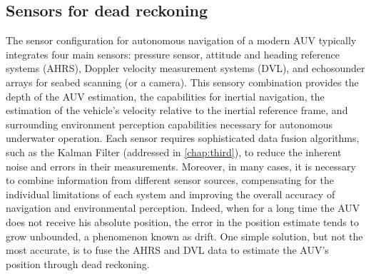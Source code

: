 \subsection{Sensors for dead reckoning} %
The sensor configuration for autonomous navigation of a modern AUV typically integrates four main sensors: pressure sensor, attitude and heading reference 
systems (AHRS), Doppler velocity measurement systems (DVL), and echosounder arrays for seabed scanning (or a camera). This sensory combination provides the depth of the AUV estimation, 
the capabilities for inertial navigation, the estimation of the vehicle's velocity relative to the inertial reference frame, and surrounding environment perception 
capabilities necessary for autonomous underwater operation. 
Each sensor requires sophisticated data fusion algorithms, such as the Kalman Filter (addressed in \ref{chap:third}), to reduce the inherent noise and
errors in their measurements. Moreover, in many cases, it is necessary to combine information from different sensor sources, compensating for the individual 
limitations of each system and improving the overall accuracy of navigation and environmental perception. Indeed, when for a long time the AUV does not receive 
his absolute position, the error in the position estimate tends to grow unbounded, a phenomenon known as drift. One simple solution, but not the most accurate, 
is to fuse the AHRS and DVL data to estimate the AUV's position through dead reckoning.


